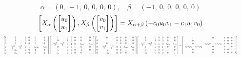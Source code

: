 \documentclass[11pt]{article}
\theoremstyle{definition}
\begin{document}
\[
\alpha = \left( 0, \  -1, \  0, \  0, \  0, \  0\right), \quad \beta = \left( -1, \  0, \  0, \  0, \  0, \  0\right)
\]
\[
\scaletoalign{\textwidth}{\left[ X_{\alpha}\left(\left[\begin{matrix}u_{0}\\u_{1}\end{matrix}\right]\right), X_{\beta}\left(\left[\begin{matrix}v_{0}\\v_{1}\end{matrix}\right]\right) \right] = X_{\alpha + \beta}\left(- c_{0} u_{0} v_{1} - c_{1} u_{1} v_{0}\right)}
\]
\[
\scaletoalign{\textwidth}{{\left[\begin{matrix}1 & 0 & 0 & 0 & 0 & 0\\0 & 1 & 0 & 0 & 0 & 0\\0 & 0 & 1 & 0 & 0 & 0\\0 & - \frac{c_{0} u_{0}^{2}}{2} - \frac{c_{1} u_{1}^{2}}{2} & 0 & 1 & - c_{0} u_{0} & - c_{1} u_{1}\\0 & u_{0} & 0 & 0 & 1 & 0\\0 & u_{1} & 0 & 0 & 0 & 1\end{matrix}\right]} {\left[\begin{matrix}1 & 0 & 0 & 0 & 0 & 0\\0 & 1 & 0 & 0 & 0 & 0\\- \frac{c_{0} v_{1}^{2}}{2} - \frac{c_{1} v_{0}^{2}}{2} & 0 & 1 & 0 & - c_{0} v_{1} & - c_{1} v_{0}\\0 & 0 & 0 & 1 & 0 & 0\\v_{1} & 0 & 0 & 0 & 1 & 0\\v_{0} & 0 & 0 & 0 & 0 & 1\end{matrix}\right]} {\left[\begin{matrix}1 & 0 & 0 & 0 & 0 & 0\\0 & 1 & 0 & 0 & 0 & 0\\0 & 0 & 1 & 0 & 0 & 0\\0 & - \frac{c_{0} u_{0}^{2}}{2} - \frac{c_{1} u_{1}^{2}}{2} & 0 & 1 & c_{0} u_{0} & c_{1} u_{1}\\0 & - u_{0} & 0 & 0 & 1 & 0\\0 & - u_{1} & 0 & 0 & 0 & 1\end{matrix}\right]} {\left[\begin{matrix}1 & 0 & 0 & 0 & 0 & 0\\0 & 1 & 0 & 0 & 0 & 0\\- \frac{c_{0} v_{1}^{2}}{2} - \frac{c_{1} v_{0}^{2}}{2} & 0 & 1 & 0 & c_{0} v_{1} & c_{1} v_{0}\\0 & 0 & 0 & 1 & 0 & 0\\- v_{1} & 0 & 0 & 0 & 1 & 0\\- v_{0} & 0 & 0 & 0 & 0 & 1\end{matrix}\right]} = {\left[\begin{matrix}1 & 0 & 0 & 0 & 0 & 0\\0 & 1 & 0 & 0 & 0 & 0\\0 & c_{0} u_{0} v_{1} + c_{1} u_{1} v_{0} & 1 & 0 & 0 & 0\\- c_{0} u_{0} v_{1} - c_{1} u_{1} v_{0} & 0 & 0 & 1 & 0 & 0\\0 & 0 & 0 & 0 & 1 & 0\\0 & 0 & 0 & 0 & 0 & 1\end{matrix}\right]}}
\]
\end{document}

